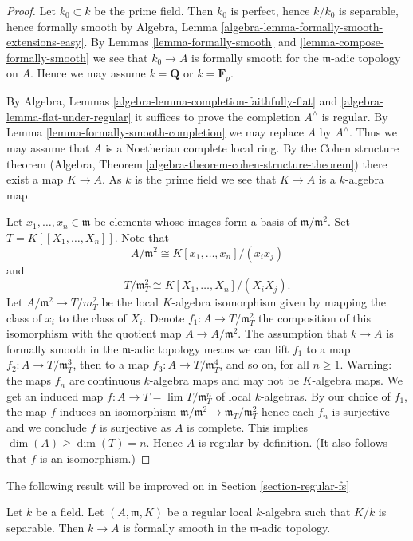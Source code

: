 \begin{proof}
Let $k_0 \subset k$ be the prime field. Then $k_0$ is perfect, hence
$k / k_0$ is separable, hence formally smooth by
Algebra, Lemma \ref{algebra-lemma-formally-smooth-extensions-easy}. By
Lemmas \ref{lemma-formally-smooth} and \ref{lemma-compose-formally-smooth}
we see that $k_0 \to A$ is formally smooth for the $\mathfrak m$-adic
topology on $A$. Hence we may assume $k = \mathbf{Q}$ or $k = \mathbf{F}_p$.

\medskip\noindent
By Algebra, Lemmas \ref{algebra-lemma-completion-faithfully-flat} and
\ref{algebra-lemma-flat-under-regular} it
suffices to prove the completion $A^\wedge$ is regular.
By Lemma \ref{lemma-formally-smooth-completion} we may replace
$A$ by $A^\wedge$. Thus we may assume that $A$ is a Noetherian
complete local ring. By the Cohen structure theorem
(Algebra, Theorem \ref{algebra-theorem-cohen-structure-theorem})
there exist a map $K \to A$. As $k$ is the prime field we see that
$K \to A$ is a $k$-algebra map.

\medskip\noindent
Let $x_1, \ldots, x_n \in \mathfrak m$ be elements whose images
form a basis of $\mathfrak m/\mathfrak m^2$.
Set $T = K[[X_1, \ldots, X_n]]$. Note that
$$
A/\mathfrak m^2 \cong K[x_1, \ldots, x_n]/(x_ix_j)
$$
and
$$
T/\mathfrak m_T^2 \cong K[X_1, \ldots, X_n]/(X_iX_j).
$$
Let $A/\mathfrak m^2 \to T/m_T^2$ be the local $K$-algebra isomorphism
given by mapping the class of $x_i$ to the class of $X_i$.
Denote $f_1 : A \to T/\mathfrak m_T^2$ the composition of this
isomorphism with the quotient map $A \to A/\mathfrak m^2$.
The assumption that $k \to A$ is formally smooth in the $\mathfrak m$-adic
topology means we can lift $f_1$ to a map
$f_2 : A \to T/\mathfrak{m}_T^3$, then to a map
$f_3 : A \to T/\mathfrak{m}_T^4$, and so on, for all $n \geq 1$.
Warning: the maps $f_n$ are continuous $k$-algebra maps and may not
be $K$-algebra maps. We get an induced map
$f : A \to T = \lim T/\mathfrak m_T^n$ of local $k$-algebras.
By our choice of $f_1$, the map $f$ induces an
isomorphism $\mathfrak m/\mathfrak m^2 \to \mathfrak m_T/\mathfrak m_T^2$
hence each $f_n$ is surjective and we conclude $f$ is surjective as $A$ is
complete. This implies $\dim(A) \geq \dim(T) = n$. Hence $A$ is regular
by definition. (It also follows that $f$ is an isomorphism.)
\end{proof}

\noindent
The following result will be improved on in
Section \ref{section-regular-fs}

\begin{lemma}
\label{lemma-regular-implies-fs}
Let $k$ be a field. Let $(A, \mathfrak m, K)$ be a regular local
$k$-algebra such that $K/k$ is separable. Then $k \to A$
is formally smooth in the $\mathfrak m$-adic topology.
\end{lemma}

